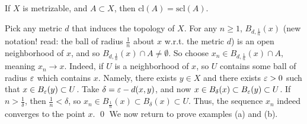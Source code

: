 \begin{simpleclaim}
    If $X$ is metrizable, and $A \subset X$, then $\mathrm{cl} (A) = \mathrm{scl} (A)$.
\end{simpleclaim}
\noindent Pick any metric $d$ that induces the topology of $X$. For any $n \geq 1$, $B_{d, \frac{1}{n}}(x)$ (new notation! read: the ball of radius $\frac{1}{n}$ about $x$ w.r.t. the metric $d$) is an open neighborhood of $x$, and so $B_{d, \frac{1}{n}}(x) \cap A \neq \emptyset$. So choose $x_n \in B_{d, \frac{1}{n}}(x) \cap A$, meaning $x_n \to x$. Indeed, if $U$ is a neighborhood of $x$, so $U$ contains some ball of radius $\varepsilon$ which contains $x$. Namely, there exists $y \in X$ and there exists $\varepsilon > 0$ such that $x \in B_\varepsilon(y) \subset U$.
\medskip\newline
Take $\delta = \varepsilon - d(x, y)$, and now $x \in B_\delta(x) \subset B_\varepsilon(y) \subset U$. If $n > \frac{1}{\delta}$, then $\frac{1}{n} < \delta$, so $x_n \in B_{\frac{1}{n}}(x) \subset B_\delta(x) \subset U$. Thus, the sequence $x_n$ indeed converges to the point $x$. \qed
\medskip\newline
\noindent We now return to prove examples (a) and (b).
